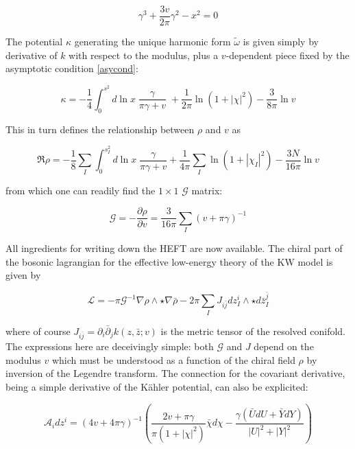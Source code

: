 \begin{equation}
	\gamma^3 + \frac{3v}{2\pi} \gamma^2 - x^2 = 0
	\label{}
\end{equation}

The potential $\kappa$ generating the unique harmonic form $\tilde\omega$ is given simply by derivative of $k$ with respect to the modulus, plus a $v$-dependent piece fixed by the asymptotic condition \ref{asycond}:

\begin{equation}
	\kappa = -\frac{1}{4} \int_0^{s^2} d\ln x \; \frac{\gamma}{\pi\gamma+v} \; + \frac{1}{2\pi} \ln(1+ |\chi|^2) - \frac{3}{8\pi}\ln v
	\label{}
\end{equation}

This in turn defines the relationship between $\rho$ and $v$ as

\begin{equation}
	\Re \rho = - \frac{1}{8} \sum_I \int_0^{s_I^2} d\ln x \; \frac{\gamma}{\pi\gamma + v} + \frac{1}{4\pi}\sum_I \ln(1+|\chi_I|^2) - \frac{3N}{16\pi} \ln v
\end{equation}

from which one can readily find the $1\times1$ $\mathcal{G}$ matrix:

\begin{equation}
	\mathcal{G} = - \frac{\partial \rho}{\partial v} = \frac{3}{16\pi}\sum_I (v+\pi\gamma)^{-1}
	\label{}
\end{equation}

All ingredients for writing down the HEFT are now available. The chiral part of the bosonic lagrangian for the effective low-energy theory of the KW model is given by

\begin{equation}
	\mathcal{L} = - \pi \mathcal{G}^{-1} \nabla \rho \wedge \star \nabla \bar \rho - 2\pi \sum_I J_{i\bar j} dz_I^i \wedge \star d\bar z_I^{\bar j} 
	\label{}
\end{equation}

where of course $J_{i\bar j} = \partial_i \bar \partial_j k(z,\bar z; v)$ is the metric tensor of the resolved conifold. The expressions here are deceivingly simple: both $\mathcal{G}$ and $J$ depend on the modulus $v$ which must be understood as a function of the chiral field $\rho$ by inversion of the Legendre transform. The connection for the covariant derivative, being a simple derivative of the K\"ahler potential, can also be explicited:

\begin{equation}
	\mathcal{A}_i dz^i = (4v + 4\pi \gamma)^{-1} \left( \frac{2v + \pi\gamma}{\pi(1+|\chi|^2)}\bar\chi d\chi - \frac{\gamma\left( \bar U dU + \bar Y dY \right)}{|U|^2 + |Y|^2} \right)
	\label{}
\end{equation}
